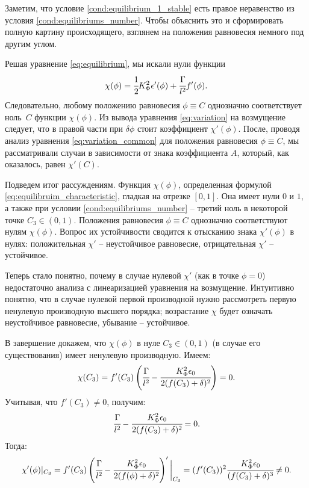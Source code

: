 Заметим, что условие \eqref{cond:equilibrium_1_stable} есть правое неравенство из условия \eqref{cond:equilibriums_number}. Чтобы объяснить это и сформировать полную картину происходящего, взглянем на положения равновесия немного под другим углом.

Решая уравнение \eqref{eq:equilibrium}, мы искали нули функции 
\begin{equation}
	\chi(\phi) = \cfrac{1}{2} K_\Phi^2 \epsilon'(\phi) + \cfrac{\Gamma}{l^2} f'(\phi) {\text{.}}
	\label{eq:equilibruim_characteristic}
\end{equation}
Следовательно, любому положению равновесия $\phi \equiv C$ однозначно соответствует ноль~$C$ функции $\chi(\phi)$. Из вывода уравнения \eqref{eq:variation} на возмущение следует, что в правой части при $\delta \phi$ стоит коэффициент $\chi'(\phi)$. После, проводя анализ уравнения \eqref{eq:variation_common} для положения равновесия $\phi \equiv C$, мы рассматривали случаи в зависимости от знака коэффициента $A$, который, как оказалось, равен $\chi'(C)$.

Подведем итог рассуждениям. Функция $\chi(\phi)$, определенная формулой \eqref{eq:equilibruim_characteristic}, гладкая на отрезке $[0, 1]$. Она имеет нули $0$ и $1$, а также при условии \eqref{cond:equilibriums_number} -- третий ноль в некоторой точке $C_3 \in (0, 1)$. Положения равновесия $\phi \equiv C$ однозначно соответствуют нулям $\chi(\phi)$. Вопрос их устойчивости сводится к отысканию знака $\chi'(\phi)$ в нулях: положительная $\chi'$ -- неустойчивое равновесие, отрицательная $\chi'$ -- устойчивое.

Теперь стало понятно, почему в случае нулевой $\chi'$ (как в точке $\phi = 0$) недостаточно анализа с линеаризацией уравнения на возмущение. Интуитивно понятно, что в случае нулевой первой производной нужно рассмотреть первую ненулевую производную высшего порядка; возрастание $\chi$ будет означать неустойчивое равновесие, убывание -- устойчивое.

В завершение докажем, что $\chi(\phi)$ в нуле $C_3 \in (0, 1)$ (в случае его существования) имеет ненулевую производную. Имеем:
$$\chi(C_3) = f'(C_3) \left( \cfrac{\Gamma}{l^2} - \cfrac{K_\Phi^2 \epsilon_0}{2 (f(C_3) + \delta)^2} \right) = 0 {\text{.}}$$
Учитывая, что $f'(C_3) \ne 0$, получим:
$$\cfrac{\Gamma}{l^2} - \cfrac{K_\Phi^2 \epsilon_0}{2 (f(C_3) + \delta)^2} = 0 {\text{.}}$$
Тогда:
$$\chi'(\phi)|_{C_3} = f'(C_3) \left( \cfrac{\Gamma}{l^2} - \cfrac{K_\Phi^2 \epsilon_0}{2 (f(\phi) + \delta)^2} \right) ' \bigg|_{C_3} = (f'(C_3))^2 \cfrac{K_\Phi^2 \epsilon_0}{(f(C_3) + \delta)^3} \ne 0 {\text{.}}$$

